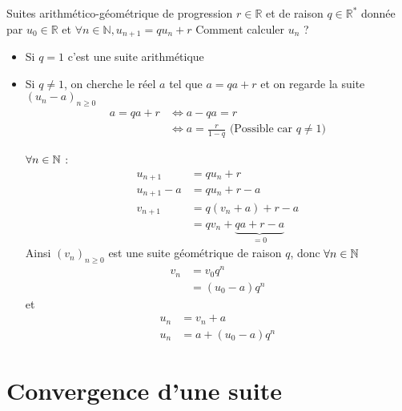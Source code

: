 \begin{graybox}
    \begin{proposition}
    Suites arithmético-géométrique de progression $r \in \mathbb{R}$ et de raison $q \in \mathbb{R^*}$ donnée par $u_0 \in \mathbb{R}$ et $\forall n \in \mathbb{N}, u_{n+1} = qu_n + r$ Comment calculer $u_n$ ?
        \begin{itemize}
            \item Si $q = 1$ c'est une suite arithmétique
            \item Si $q \neq 1$, on cherche le réel $a$ tel que $a = q a + r$ et on regarde la suite $(u_n - a)_{n \geqslant 0}$
            	 \begin{align*}
                	 a = qa + r &\iff a - qa = r \\
                	            &\iff a = \frac{r}{1 - q} \text{ (Possible 
                 car } q\neq 1)
              \end{align*} 
              
              $\forall n \in \mathbb{N}$ :
              	\begin{align*}
            	u_{n+1} &= qu_n + r \\
            	u_{n+1} - a &= qu_n + r - a \\
            	v_{n+1} &= q(v_n + a) + r - a \\
            	        &= qv_n + \underbrace{qa + r - a}_{=0}
            	\end{align*}
             Ainsi $(v_n)_{n \geq 0}$ est une suite géométrique de raison $q$, donc $\forall n \in \mathbb{N}$
             	\begin{align*}
            	v_n &= v_0 q^n \\
            	    &= (u_0 - a) q^n
            	\end{align*}
              et 
                  \begin{align*}
                    u_n &= v_n + a \\
                    u_n &= a + (u_0 - a)q^n
                    \end{align*}
        \end{itemize}   
\end{proposition}
\end{graybox}

\section{Convergence d'une suite}

